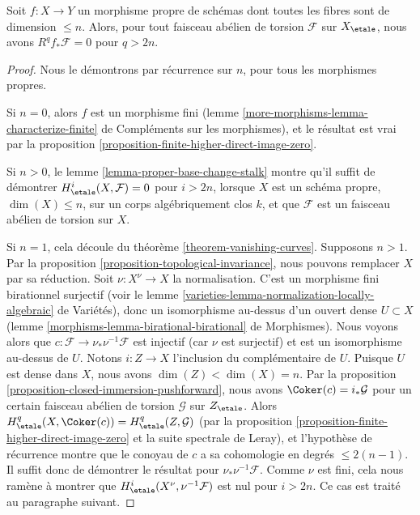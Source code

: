 \begin{lemma}
\label{lemma-cohomological-dimension-proper}
Soit $f : X \to Y$ un morphisme propre de schémas
dont toutes les fibres sont de dimension $\leq n$.
Alors, pour tout faisceau abélien de torsion $\mathcal{F}$ sur $X_\etale$,
nous avons $R^qf_*\mathcal{F} = 0$ pour $q > 2n$.
\end{lemma}

\begin{proof}
Nous le démontrons par récurrence sur $n$, pour tous les morphismes propres.

\medskip\noindent
Si $n = 0$, alors $f$ est un morphisme fini
(lemme \ref{more-morphisms-lemma-characterize-finite} de Compléments sur les morphismes),
et le
résultat est vrai par la proposition \ref{proposition-finite-higher-direct-image-zero}.

\medskip\noindent
Si $n > 0$, le lemme \ref{lemma-proper-base-change-stalk}
montre qu'il suffit de démontrer $H^i_\etale(X, \mathcal{F}) = 0$
pour $i > 2n$, lorsque $X$ est un schéma propre, $\dim(X) \leq n$,
sur un corps algébriquement clos $k$,
et que $\mathcal{F}$ est un faisceau abélien de torsion sur $X$.

\medskip\noindent
Si $n = 1$, cela découle du théorème \ref{theorem-vanishing-curves}.
Supposons $n > 1$. Par la proposition \ref{proposition-topological-invariance},
nous pouvons remplacer $X$ par sa réduction.
Soit $\nu : X^\nu \to X$ la normalisation.
C'est un morphisme fini birationnel surjectif
(voir le lemme \ref{varieties-lemma-normalization-locally-algebraic} de Variétés),
donc un isomorphisme au-dessus d'un ouvert dense $U \subset X$
(lemme \ref{morphisms-lemma-birational-birational} de Morphismes).
Nous voyons alors que
$c : \mathcal{F} \to \nu_*\nu^{-1}\mathcal{F}$ est injectif
(car $\nu$ est surjectif) et est un isomorphisme au-dessus de $U$.
Notons $i : Z \to X$ l'inclusion du complémentaire de $U$.
Puisque $U$ est dense dans $X$, nous avons $\dim(Z) < \dim(X) = n$.
Par la proposition \ref{proposition-closed-immersion-pushforward}, nous avons
$\Coker(c) = i_*\mathcal{G}$ pour un certain
faisceau abélien de torsion $\mathcal{G}$ sur $Z_\etale$.
Alors $H^q_\etale(X, \Coker(c)) = H^q_\etale(Z, \mathcal{G})$
(par la proposition \ref{proposition-finite-higher-direct-image-zero}
et la suite spectrale de Leray), et l'hypothèse de récurrence montre que
le conoyau de $c$ a sa cohomologie en degrés $\leq 2(n - 1)$.
Il suffit donc de démontrer le résultat pour $\nu_*\nu^{-1}\mathcal{F}$.
Comme $\nu$ est fini, cela nous ramène à montrer
que $H^i_\etale(X^\nu, \nu^{-1}\mathcal{F})$ est
nul pour $i > 2n$. Ce cas est traité au paragraphe suivant.


\end{proof}
